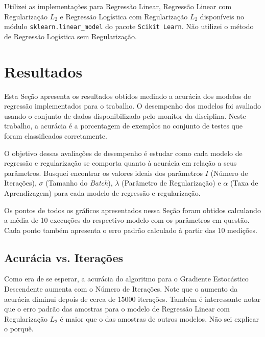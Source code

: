 \documentclass[a4paper, 12pt]{article}
\begin{document}
Utilizei as implementações para Regressão Linear, Regressão Linear com
Regularização $L_2$ e Regressão Logística com Regularização $L_2$ disponíveis
no módulo \texttt{sklearn.linear\_model} do pacote \texttt{Scikit Learn}.  Não
utilizei o método de Regressão Logística sem Regularização.

\section{Resultados}

Esta Seção apresenta os resultados obtidos medindo a acurácia dos modelos de
regressão implementados para o trabalho. O desempenho dos modelos foi avaliado
usando o conjunto de dados disponibilizado pelo monitor da disciplina. Neste
trabalho, a acurácia é a porcentagem de exemplos no conjunto de testes que
foram classificados corretamente.

O objetivo dessas avaliações de desempenho é estudar como cada modelo de
regressão e regularização se comporta quanto à acurácia em relação a seus
parâmetros. Busquei encontrar os valores ideais dos parâmetros $I$ (Número de
Iterações), $\sigma$ (Tamanho do \textit{Batch}), $\lambda$ (Parâmetro de
Regularização) e $\alpha$ (Taxa de Aprendizagem) para cada modelo de regressão
e regularização.

Os pontos de todos os gráficos apresentados nessa Seção foram obtidos
calculando a média de 10 execuções do respectivo modelo com os parâmetros
em questão. Cada ponto também apresenta o erro padrão calculado à partir
das 10 medições.

\newpage
\subsection{Acurácia vs. Iterações}

Como era de se esperar, a acurácia do algoritmo para o Gradiente
Estocástico Descendente aumenta com o Número de Iterações. Note
que o aumento da acurácia diminui depois de cerca de $15000$ iterações.
Também é interessante notar que o erro padrão das amostras para o modelo de
Regressão Linear com Regularização $L_2$ é maior que o das amostras de outros
modelos. Não sei explicar o porquê.
\end{document}
